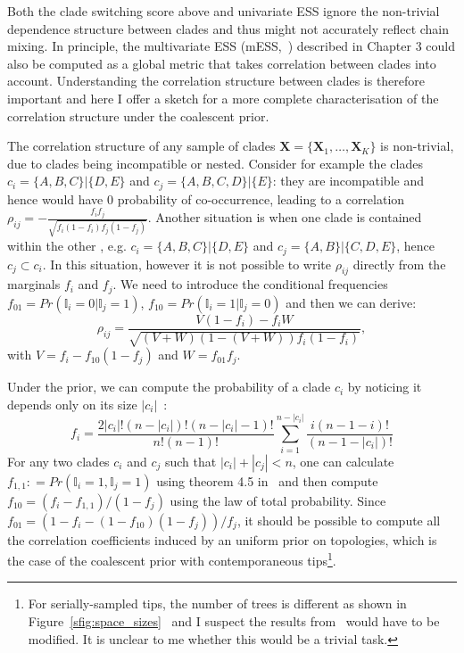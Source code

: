 Both the clade switching score above and univariate ESS ignore the non-trivial dependence structure between clades and thus might not accurately reflect chain mixing.
In principle, the multivariate ESS (mESS,~\cite{Vats2015}) described in Chapter 3 could also be computed as a global metric that takes correlation between clades into account.
Understanding the correlation structure between clades is therefore important and here I offer a sketch for a more complete characterisation of the correlation structure under the  coalescent prior.

The correlation structure of any sample of clades $\boldsymbol X = \{\boldsymbol X_1, \ldots, \boldsymbol X_K \}$ is non-trivial, due to clades being incompatible or nested.
Consider for example the clades $c_i = \{A, B, C\} | \{ D, E\}$ and $c_j = \{A, B, C, D\} | \{ E\}$: they are incompatible and hence would have $0$ probability of co-occurrence, leading to a correlation $ \rho_{ij} = -\frac{f_if_j}{\sqrt{f_i(1-f_i)f_j(1-f_j)}}$.
Another situation is when one clade is contained within the other , e.g. $c_i = \{A, B, C\} | \{ D, E\}$ and $c_j = \{A, B\} | \{C, D, E \}$, hence $c_j \subset c_i$.
In this situation, however it is not possible to write $\rho_{ij}$ directly from the marginals $f_i$ and $f_j$.
We need to introduce the conditional frequencies $f_{01} = Pr(\mathbb{I}_i = 0 | \mathbb{I}_j = 1)$, $f_{10} = Pr(\mathbb{I}_i = 1 | \mathbb{I}_j = 0)$ and then we can derive:
\begin{equation}
\rho_{ij} = \frac{V(1-f_i) - f_iW}{\sqrt{(V + W)(1- (V + W))f_i(1-f_i)}},  
\end{equation}
with $V = f_i -f_{10}(1-f_j)$ and $W = f_{01}f_j$.

Under the prior, we can compute the probability of a clade $c_i$ by noticing it depends only on its size $|c_i|$~\citep[Eq. 14]{Brown1994}:
\begin{equation}
\label{eq:clade_prob}
 f_i = \frac{2|c_i|!(n-|c_i|)!(n-|c_i|-1)!}{n!(n-1)!}\sum_{i=1}^{n-|c_i|}\frac{i(n-1-i)!}{(n-1-|c_i|)!}
\end{equation}
For any two clades $c_i$ and $c_j$ such that $|c_i| + |c_j| < n$, one can calculate $f_{1,1} : = Pr(\mathbb{I}_i = 1, \mathbb{I}_j = 1)$ using theorem 4.5 in~\cite{Zhu2011} and then compute  $f_{10} = (f_i - f_{1,1})/(1-f_j)$ using  the law of total probability.
Since $f_{01} =(1-f_i - (1-f_{10})(1-f_j))/f_j$, it should be possible to compute all the correlation coefficients induced by an uniform prior on topologies, which is the case of the coalescent prior with contemporaneous tips\footnote{For serially-sampled tips, the number of trees is different as shown in Figure~\ref{sfig:space_sizes}~\citep{Gavryushkina2013} and I suspect the results from~\cite{Brown1994} would have to be modified. It is unclear to me whether this would be a trivial task.}.

